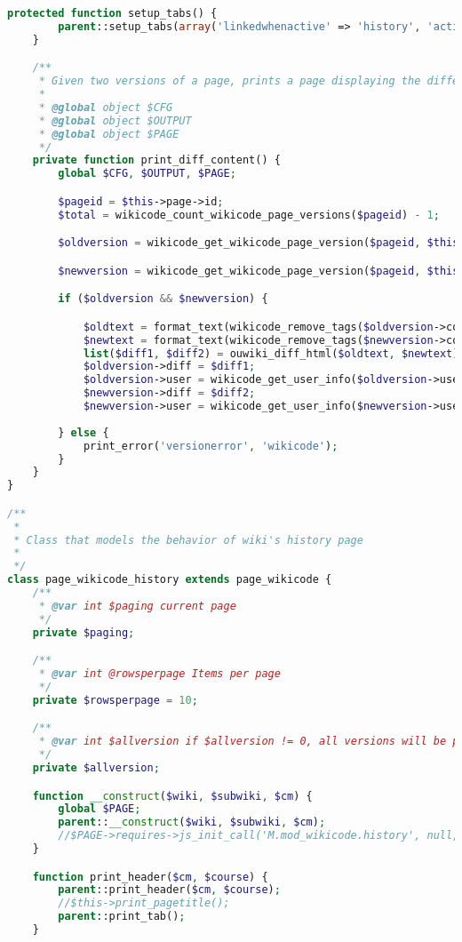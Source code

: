 \begin{lstlisting}[language=PHP]
    protected function setup_tabs() {
        parent::setup_tabs(array('linkedwhenactive' => 'history', 'activetab' => 'history'));
    }

    /**
     * Given two versions of a page, prints a page displaying the differences between them.
     *
     * @global object $CFG
     * @global object $OUTPUT
     * @global object $PAGE
     */
    private function print_diff_content() {
        global $CFG, $OUTPUT, $PAGE;

        $pageid = $this->page->id;
        $total = wikicode_count_wikicode_page_versions($pageid) - 1;

        $oldversion = wikicode_get_wikicode_page_version($pageid, $this->compare);

        $newversion = wikicode_get_wikicode_page_version($pageid, $this->comparewith);

        if ($oldversion && $newversion) {

            $oldtext = format_text(wikicode_remove_tags($oldversion->content), FORMAT_PLAIN, array('overflowdiv'=>true));
			$newtext = format_text(wikicode_remove_tags($newversion->content), FORMAT_PLAIN, array('overflowdiv'=>true));
            list($diff1, $diff2) = ouwiki_diff_html($oldtext, $newtext);
            $oldversion->diff = $diff1;
            $oldversion->user = wikicode_get_user_info($oldversion->userid);
            $newversion->diff = $diff2;
            $newversion->user = wikicode_get_user_info($newversion->userid);
			
        } else {
            print_error('versionerror', 'wikicode');
        }
    }
}

/**
 *
 * Class that models the behavior of wiki's history page
 *
 */
class page_wikicode_history extends page_wikicode {
    /**
     * @var int $paging current page
     */
    private $paging;

    /**
     * @var int @rowsperpage Items per page
     */
    private $rowsperpage = 10;

    /**
     * @var int $allversion if $allversion != 0, all versions will be printed in a signle table
     */
    private $allversion;

    function __construct($wiki, $subwiki, $cm) {
        global $PAGE;
        parent::__construct($wiki, $subwiki, $cm);
        //$PAGE->requires->js_init_call('M.mod_wikicode.history', null, true);
    }

    function print_header($cm, $course) {
        parent::print_header($cm, $course);
        //$this->print_pagetitle();
        parent::print_tab();
    }


\end{lstlisting}
